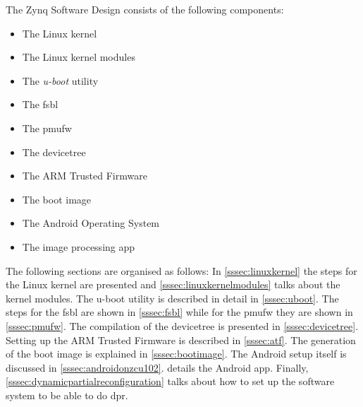 The Zynq Software Design consists of the following components:
\begin{itemize}
	\item The Linux kernel
	\item The Linux kernel modules
	\item The \emph{u-boot} utility
	\item The \gls{fsbl}
	\item The \gls{pmufw}
	\item The devicetree
	\item The ARM Trusted Firmware
	\item The boot image
	\item The Android Operating System
	\item The image processing app
\end{itemize}

The following sections are organised as follows: In \cref{sssec:linuxkernel} the steps for the Linux kernel are presented and \cref{sssec:linuxkernelmodules} talks about the kernel modules. The u-boot utility is described in detail in \cref{sssec:uboot}. The steps for the \gls{fsbl} are shown in \cref{sssec:fsbl} while for the \gls{pmufw} they are shown in \cref{sssec:pmufw}. The compilation of the devicetree is presented in \cref{sssec:devicetree}. Setting up the ARM Trusted Firmware is described in \cref{sssec:atf}. The generation of the boot image is explained in \cref{sssec:bootimage}. The Android setup itself is discussed in \cref{sssec:androidonzcu102}.  details the Android app. Finally, \cref{sssec:dynamicpartialreconfiguration} talks about how to set up
the software system to be able to do \gls{dpr}.

